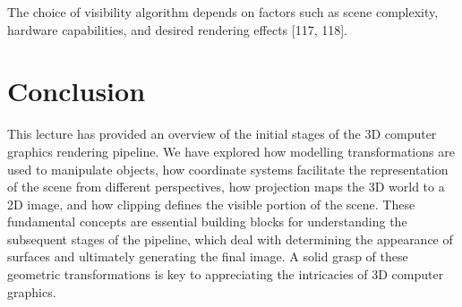 \documentclass[12pt]{article}
\begin{document}
The choice of visibility algorithm depends on factors such as scene complexity, hardware capabilities, and desired rendering effects [117, 118].

\section{Conclusion}

This lecture has provided an overview of the initial stages of the 3D computer graphics rendering pipeline. We have explored how modelling transformations are used to manipulate objects, how coordinate systems facilitate the representation of the scene from different perspectives, how projection maps the 3D world to a 2D image, and how clipping defines the visible portion of the scene. These fundamental concepts are essential building blocks for understanding the subsequent stages of the pipeline, which deal with determining the appearance of surfaces and ultimately generating the final image. A solid grasp of these geometric transformations is key to appreciating the intricacies of 3D computer graphics.
\end{document}
